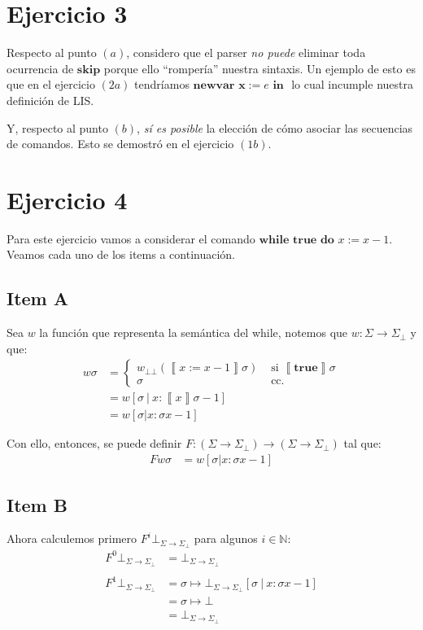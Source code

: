 \documentclass{article}
\newcommand{\sem}[1]{\left\llbracket #1\right\rrbracket}
\newcommand{\N}{\mathbb{N}}
\newcommand{\x}{\textbf{x}}
\newcommand{\cdom}{\Sigma \to \Sigma_\bot}
\newcommand{\cfbot}{\bot_{\cdom}}
\newcommand{\bbot}{\bot\!\!\!\bot}
\newcommand{\ctrue}{\textbf{true}}
\newcommand{\cskip}{\textbf{skip}}
\newcommand{\cnewvar}[3]{\textbf{newvar }#1 := #2\textbf{ in }#3}
\newcommand{\cwhile}[2]{\textbf{while }#1\textbf{ do }#2}
\begin{document}
\section*{Ejercicio 3}
Respecto al punto $(a)$, considero que el parser \textit{no puede} eliminar toda ocurrencia de $\cskip$ porque ello ``rompería'' nuestra sintaxis.
Un ejemplo de esto es que en el ejercicio $(2a)$ tendríamos $\cnewvar{\x}{e}{}$ lo cual incumple nuestra definición de LIS.

Y, respecto al punto $(b)$, \textit{sí es posible} la elección de cómo asociar las secuencias de comandos.
Esto se demostró en el ejercicio $(1b)$.

\section*{Ejercicio 4}
Para este ejercicio vamos a considerar el comando $\cwhile{\ctrue}{x := x-1}$.
Veamos cada uno de los items a continuación.

\subsection*{Item A}
Sea $w$ la función que representa la semántica del while, notemos que $w : \Sigma \to \Sigma_\bot$ y que:
\begin{equation*}
  \begin{aligned}
      w \sigma &= \begin{cases}
              w_{\bbot} (\sem{x := x-1}\sigma) &\text{ si }\sem{\ctrue}\sigma \\ 
              \sigma & \text{ cc. }
            \end{cases} \\ 
               &= w [\sigma\ |\ x : \sem{x}\sigma - 1] \\ 
               &= w [\sigma | x : \sigma x - 1]
  \end{aligned}
\end{equation*}

Con ello, entonces, se puede definir $F : (\Sigma \to \Sigma_\bot) \to (\Sigma \to \Sigma_\bot)$ tal que:
\begin{equation*}
  \begin{aligned}
    F w \sigma &= w [\sigma | x : \sigma x - 1]
  \end{aligned}
\end{equation*}

\subsection*{Item B}
Ahora calculemos primero $F^i \cfbot$ para algunos $i \in \N$:
\begin{equation*}
  \begin{aligned}
    F^0 \cfbot &= \cfbot \\ 
    \\ 
    F^1 \cfbot &= \sigma \mapsto \cfbot [\sigma\ |\ x : \sigma x - 1] \\ 
               &= \sigma \mapsto \bot \\ 
               &= \cfbot
  \end{aligned}
\end{equation*}
\end{document}
